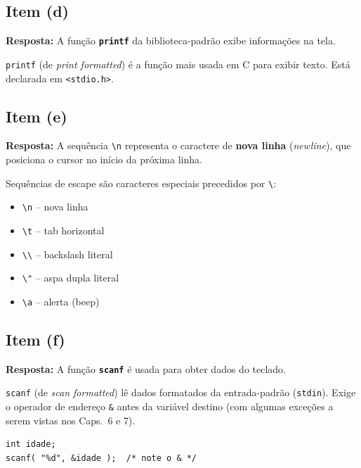 \documentclass[12pt,a4paper]{article}
\begin{document}
\subsection*{Item (d)}
\begin{respostabox}
\textbf{Resposta:} A função \textcolor{deitelblue}{\textbf{\texttt{printf}}} da
biblioteca-padrão exibe informações na tela.

\texttt{printf} (de \textit{print formatted}) é a função mais usada em C para
exibir texto. Está declarada em \texttt{<stdio.h>}.
\end{respostabox}

\subsection*{Item (e)}
\begin{respostabox}
\textbf{Resposta:} A sequência \texttt{\textbackslash n} representa o caractere
de \textcolor{deitelblue}{\textbf{nova linha}} (\textit{newline}), que posiciona
o cursor no início da próxima linha.

Sequências de escape são caracteres especiais precedidos por \texttt{\textbackslash}:
\begin{itemize}[noitemsep]
  \item \texttt{\textbackslash n} -- nova linha
  \item \texttt{\textbackslash t} -- tab horizontal
  \item \texttt{\textbackslash \textbackslash} -- backslash literal
  \item \texttt{\textbackslash "} -- aspa dupla literal
  \item \texttt{\textbackslash a} -- alerta (beep)
\end{itemize}
\end{respostabox}

\subsection*{Item (f)}
\begin{respostabox}
\textbf{Resposta:} A função \textcolor{deitelblue}{\textbf{\texttt{scanf}}} é usada
para obter dados do teclado.

\texttt{scanf} (de \textit{scan formatted}) lê dados formatados da entrada-padrão
(\texttt{stdin}). Exige o operador de endereço \texttt{\&} antes da variável
destino (com algumas exceções a serem vistas nos Caps.~6 e 7).

\begin{lstlisting}
int idade;
scanf( "%d", &idade );  /* note o & */
\end{lstlisting}
\end{respostabox}
\end{document}
